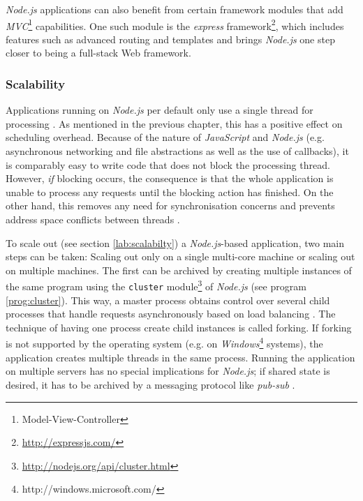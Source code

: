 \textit{Node.js} applications can also benefit from certain framework modules that add \textit{MVC}\footnote{Model-View-Controller} capabilities. One such module is the \textit{express} framework\footnote{\url{http://expressjs.com/}}, which includes features such as advanced routing and templates and brings \textit{Node.js} one step closer to being a full-stack Web framework.

\subsubsection*{Scalability}
Applications running on \textit{Node.js} per default only use a single thread for processing \cite{node-loop}. As mentioned in the previous chapter, this has a positive effect on scheduling overhead. Because of the nature of \textit{JavaScript} and \textit{Node.js} (e.g. asynchronous networking and file abstractions as well as the use of callbacks), it is comparably easy to write code that does not block the processing thread. However, \textit{if} blocking occurs, the consequence is that the whole application is unable to process any requests until the blocking action has finished. On the other hand, this removes any need for synchronisation concerns and prevents address space conflicts between threads \cite[p. 105]{Erb2012}.

To scale out (see section \ref{lab:scalabilty}) a \textit{Node.js}-based application, two main steps can be taken: Scaling out only on a single multi-core machine or scaling out on multiple machines. The first can be archived by creating multiple instances of the same program using the \texttt{cluster} module\footnote{\url{http://nodejs.org/api/cluster.html}} of \textit{Node.js} (see program \ref{prog:cluster}). This way, a master process obtains control over several child processes that handle requests asynchronously based on load balancing \cite[p. 64]{Hughes-Croucher2012}. The technique of having one process create child instances is called forking. If forking is not supported by the operating system (e.g. on \textit{Windows}\footnote{http://windows.microsoft.com/} systems), the application creates multiple threads in the same process. Running the application on multiple servers has no special implications for \textit{Node.js}; if shared state is desired, it has to be archived by a messaging protocol like \textit{pub-sub} \cite[p. 137]{Hughes-Croucher2012}.

